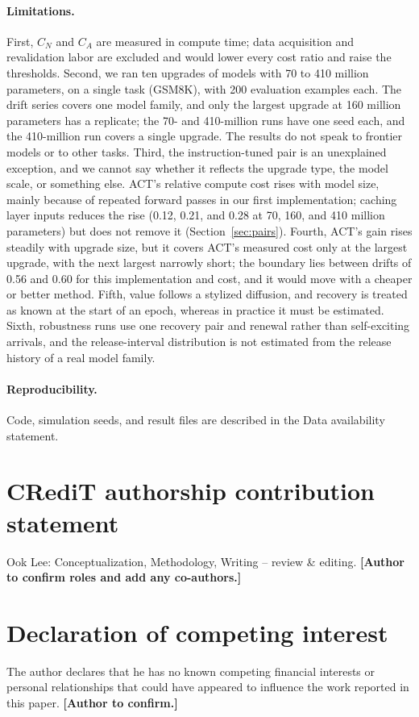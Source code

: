 \documentclass[preprint,12pt,authoryear]{elsarticle}
\begin{document}
\paragraph{Limitations.} First, $C_N$ and $C_A$ are measured in compute time; data acquisition and revalidation labor
are excluded and would lower every cost ratio and raise the thresholds. Second, we ran ten upgrades of models with 70 to 410 million parameters, on a single task (GSM8K), with 200 evaluation examples each. The drift series covers one model family, and only the largest upgrade at 160 million parameters has a replicate; the 70- and 410-million runs have one seed each, and the 410-million run covers a single upgrade. The results do not speak to frontier models or to other tasks.
Third, the instruction-tuned pair is an unexplained exception, and we cannot say whether it reflects the upgrade type, the model scale, or something else. ACT's relative compute cost rises with model size, mainly because of repeated forward passes in our first implementation; caching layer inputs reduces the rise (0.12, 0.21, and 0.28 at 70, 160, and 410 million parameters) but does not remove it (Section~\ref{sec:pairs}). Fourth, ACT's gain rises steadily with upgrade size, but it covers ACT's measured cost only at the largest upgrade, with the next largest narrowly short; the boundary lies between drifts of 0.56 and 0.60 for this implementation and cost, and it would move with a cheaper or better method. Fifth, value follows a stylized diffusion, and recovery is treated as known at the start of an epoch, whereas in
practice it must be estimated. Sixth, robustness runs use one recovery pair and renewal rather than self-exciting arrivals, and the release-interval distribution is not estimated from the release history of a real model family.

\paragraph{Reproducibility.} Code, simulation seeds, and result files are described in the Data availability statement.

\section*{CRediT authorship contribution statement}
Ook Lee: Conceptualization, Methodology, Writing -- review \& editing. \textbf{[Author to confirm roles and add any co-authors.]}

\section*{Declaration of competing interest}
The author declares that he has no known competing financial interests or personal relationships that could have appeared to influence the work reported in this paper. \textbf{[Author to confirm.]}
\end{document}
